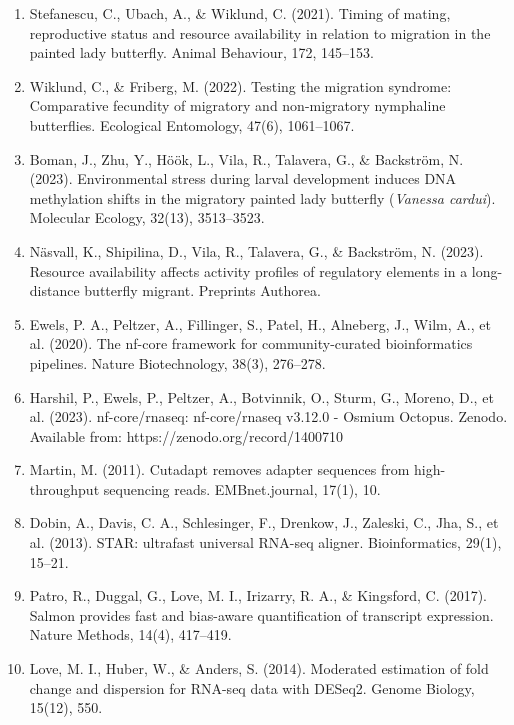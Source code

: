 \documentclass[lineno]{wiley-article}
\begin{document}
\begin{enumerate}
\item Stefanescu, C., Ubach, A., \& Wiklund, C. (2021). Timing of mating, reproductive status and resource availability in relation to migration in the painted lady butterfly. Animal Behaviour, 172, 145–153.

\item Wiklund, C., \& Friberg, M. (2022). Testing the migration syndrome: Comparative fecundity of migratory and non-migratory nymphaline butterflies. Ecological Entomology, 47(6), 1061–1067.

\item Boman, J., Zhu, Y., Höök, L., Vila, R., Talavera, G., \& Backström, N. (2023). Environmental stress during larval development induces DNA methylation shifts in the migratory painted lady butterfly (\textit{Vanessa cardui}). Molecular Ecology, 32(13), 3513–3523.

\item Näsvall, K., Shipilina, D., Vila, R., Talavera, G., \& Backström, N. (2023). Resource availability affects activity profiles of regulatory elements in a long-distance butterfly migrant. Preprints Authorea.

\item Ewels, P. A., Peltzer, A., Fillinger, S., Patel, H., Alneberg, J., Wilm, A., et al. (2020). The nf-core framework for community-curated bioinformatics pipelines. Nature Biotechnology, 38(3), 276–278.

\item Harshil, P., Ewels, P., Peltzer, A., Botvinnik, O., Sturm, G., Moreno, D., et al. (2023). nf-core/rnaseq: nf-core/rnaseq v3.12.0 - Osmium Octopus. Zenodo.
Available from: https://zenodo.org/record/1400710

\item Martin, M. (2011). Cutadapt removes adapter sequences from high-throughput sequencing reads. EMBnet.journal, 17(1), 10.

\item Dobin, A., Davis, C. A., Schlesinger, F., Drenkow, J., Zaleski, C., Jha, S., et al. (2013). STAR: ultrafast universal RNA-seq aligner. Bioinformatics, 29(1), 15–21.

\item Patro, R., Duggal, G., Love, M. I., Irizarry, R. A., \& Kingsford, C. (2017). Salmon provides fast and bias-aware quantification of transcript expression. Nature Methods, 14(4), 417–419.

\item Love, M. I., Huber, W., \& Anders, S. (2014). Moderated estimation of fold change and dispersion for RNA-seq data with DESeq2. Genome Biology, 15(12), 550.


\end{enumerate}
\end{document}
